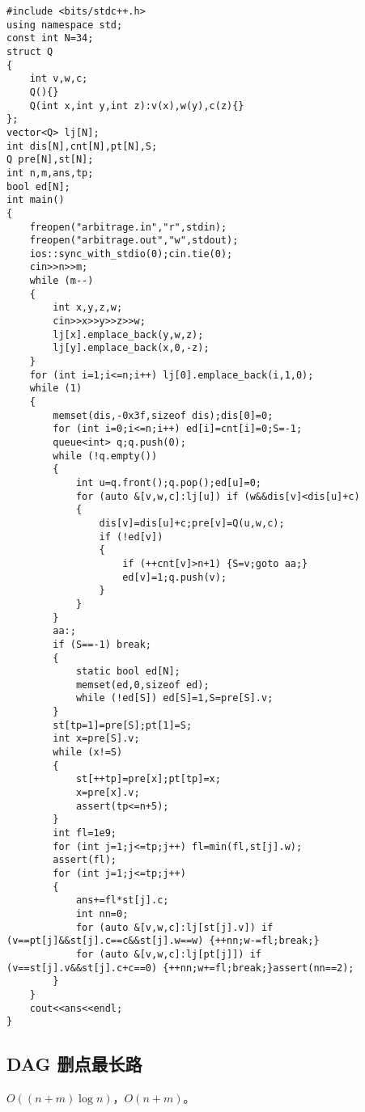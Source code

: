 \documentclass[12pt]{ctexart}
\begin{document}
\begin{lstlisting}
#include <bits/stdc++.h>
using namespace std;
const int N=34;
struct Q
{
	int v,w,c;
	Q(){}
	Q(int x,int y,int z):v(x),w(y),c(z){}
};
vector<Q> lj[N];
int dis[N],cnt[N],pt[N],S;
Q pre[N],st[N];
int n,m,ans,tp;
bool ed[N];
int main()
{
	freopen("arbitrage.in","r",stdin);
	freopen("arbitrage.out","w",stdout);
	ios::sync_with_stdio(0);cin.tie(0);
	cin>>n>>m;
	while (m--)
	{
		int x,y,z,w;
		cin>>x>>y>>z>>w;
		lj[x].emplace_back(y,w,z);
		lj[y].emplace_back(x,0,-z);
	}
	for (int i=1;i<=n;i++) lj[0].emplace_back(i,1,0);
	while (1)
	{
		memset(dis,-0x3f,sizeof dis);dis[0]=0;
		for (int i=0;i<=n;i++) ed[i]=cnt[i]=0;S=-1;
		queue<int> q;q.push(0);
		while (!q.empty())
		{
			int u=q.front();q.pop();ed[u]=0;
			for (auto &[v,w,c]:lj[u]) if (w&&dis[v]<dis[u]+c)
			{
				dis[v]=dis[u]+c;pre[v]=Q(u,w,c);
				if (!ed[v])
				{
					if (++cnt[v]>n+1) {S=v;goto aa;}
					ed[v]=1;q.push(v);
				}
			}
		}
		aa:;
		if (S==-1) break;
		{
			static bool ed[N];
			memset(ed,0,sizeof ed);
			while (!ed[S]) ed[S]=1,S=pre[S].v;
		}
		st[tp=1]=pre[S];pt[1]=S;
		int x=pre[S].v;
		while (x!=S)
		{
			st[++tp]=pre[x];pt[tp]=x;
			x=pre[x].v;
			assert(tp<=n+5);
		}
		int fl=1e9;
		for (int j=1;j<=tp;j++) fl=min(fl,st[j].w);
		assert(fl);
		for (int j=1;j<=tp;j++)
		{
			ans+=fl*st[j].c;
			int nn=0;
			for (auto &[v,w,c]:lj[st[j].v]) if (v==pt[j]&&st[j].c==c&&st[j].w==w) {++nn;w-=fl;break;}
			for (auto &[v,w,c]:lj[pt[j]]) if (v==st[j].v&&st[j].c+c==0) {++nn;w+=fl;break;}assert(nn==2);
		}
	}
	cout<<ans<<endl;
}
\end{lstlisting}



\subsection{DAG 删点最长路}

$O((n+m)\log n)$，$O(n+m)$。
\end{document}
